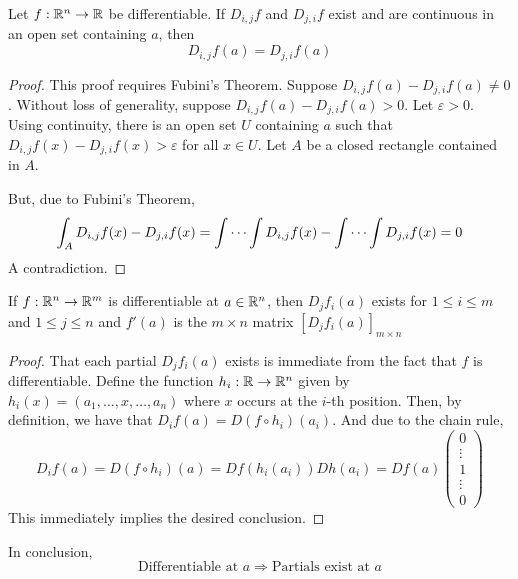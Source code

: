 \begin{theorem}
    Let $f:\mathbb{R}^n\to\mathbb{R}$ be differentiable. If $D_{i,j}f$ and $D_{j,i}f$ exist and are continuous in an open set containing $a$, then 
    \begin{equation*}
        D_{i,j}f(a) = D_{j,i}f(a)
    \end{equation*}
\end{theorem}
\begin{proof}
    This proof requires Fubini's Theorem. Suppose $D_{i,j}f(a) - D_{j,i}f(a)\ne0$. Without loss of generality, suppose $D_{i,j}f(a) - D_{j,i}f(a) > 0$. Let $\varepsilon > 0$. Using continuity, there is an open set $U$ containing $a$ such that $D_{i,j}f(x) - D_{j,i}f(x) > \varepsilon$ for all $x\in U$. Let $A$ be a closed rectangle contained in $A$.

    But, due to Fubini's Theorem, 
    \begin{equation*}
        \int_AD_{i,j}f(x) - D_{j,i}f(x) = \idotsint D_{i,j}f(x) - \idotsint D_{j,i}f(x) = 0
    \end{equation*}
    A contradiction.
\end{proof}

\begin{proposition}
    If $f:\mathbb{R}^n\to\mathbb{R}^m$ is differentiable at $a\in\mathbb{R}^n$, then $D_jf_i(a)$ exists for $1\le i\le m$ and $1\le j\le n$ and $f'(a)$ is the $m\times n$ matrix $\left[D_jf_i(a)\right]_{m\times n}$
\end{proposition}
\begin{proof}
    That each partial $D_jf_i(a)$ exists is immediate from the fact that $f$ is differentiable. Define the function $h_i:\mathbb{R}\to\mathbb{R}^n$ given by $h_i(x) = (a_1,\ldots,x,\ldots,a_n)$ where $x$ occurs at the $i$-th position. Then, by definition, we have that $D_if(a) = D(f\circ h_i)(a_i)$. And due to the chain rule, 
    \begin{equation*}
        D_if(a) = D(f\circ h_i)(a) = Df(h_i(a_i))Dh(a_i) = Df(a)
        \begin{pmatrix}
            0\\\vdots\\1\\\vdots\\0
        \end{pmatrix}
    \end{equation*}
    This immediately implies the desired conclusion.
\end{proof}

In conclusion, 
\begin{equation*}
    \text{Differentiable at $a$}\Longrightarrow\text{Partials exist at $a$}
\end{equation*}

